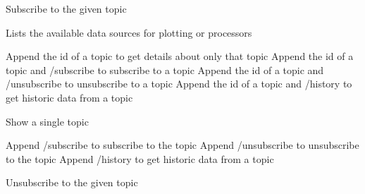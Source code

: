 \documentclass[letterpaper,10pt,english]{sphinxmanual}
\begin{document}
\begin{fulllineitems}
\label{\detokenize{src:src.views.subscribe}}
Subscribe to the given topic

\end{fulllineitems}


\begin{fulllineitems}
\label{\detokenize{src:src.views.topics}}
Lists the available data sources for plotting or processors

Append the id of a topic to get details about only that topic
Append the id of a topic and /subscribe to subscribe to a topic
Append the id of a topic and /unsubscribe to unsubscribe to a topic
Append the id of a topic and /history to get historic data from a topic

\end{fulllineitems}


\begin{fulllineitems}
\label{\detokenize{src:src.views.topics_detail}}
Show a single topic

Append /subscribe to subscribe to the topic
Append /unsubscribe to unsubscribe to the topic
Append /history to get historic data from a topic

\end{fulllineitems}


\begin{fulllineitems}
\label{\detokenize{src:src.views.unsubscribe}}
Unsubscribe to the given topic

\end{fulllineitems}
\end{document}
